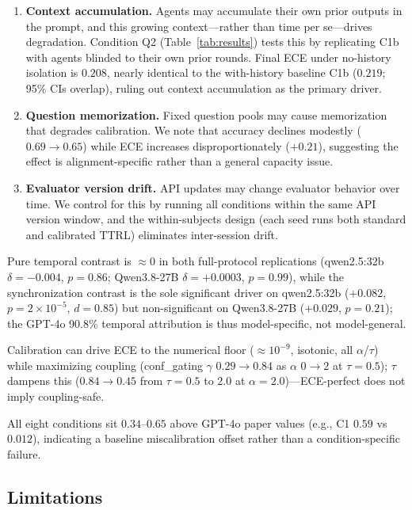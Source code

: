 \documentclass[11pt]{article}
\theoremstyle{definition}
\theoremstyle{remark}
\begin{document}
\begin{enumerate}[leftmargin=*,nosep]
    \item \textbf{Context accumulation.} Agents may accumulate their own prior outputs in the prompt, and this growing context---rather than time per se---drives degradation. Condition Q2 (Table~\ref{tab:results}) tests this by replicating C1b with agents blinded to their own prior rounds. Final ECE under no-history isolation is $0.208$, nearly identical to the with-history baseline C1b ($0.219$; 95\% CIs overlap), ruling out context accumulation as the primary driver.
    \item \textbf{Question memorization.} Fixed question pools may cause memorization that degrades calibration. We note that accuracy declines modestly ($0.69 \to 0.65$) while ECE increases disproportionately ($+0.21$), suggesting the effect is alignment-specific rather than a general capacity issue.
    \item \textbf{Evaluator version drift.} API updates may change evaluator behavior over time. We control for this by running all conditions within the same API version window, and the within-subjects design (each seed runs both standard and calibrated TTRL) eliminates inter-session drift.
\end{enumerate}

Pure temporal contrast is $\approx 0$ in both full-protocol replications (qwen2.5:32b $\delta=-0.004$, $p=0.86$; Qwen3.8-27B $\delta=+0.0003$, $p=0.99$), while the synchronization contrast is the sole significant driver on qwen2.5:32b ($+0.082$, $p=2\times10^{-5}$, $d=0.85$) but non-significant on Qwen3.8-27B ($+0.029$, $p=0.21$); the GPT-4o 90.8\% temporal attribution is thus model-specific, not model-general.

Calibration can drive ECE to the numerical floor ($\approx 10^{-9}$, isotonic, all $\alpha$/$\tau$) while maximizing coupling (conf\_gating $\gamma$ $0.29\to0.84$ as $\alpha$ $0\to2$ at $\tau=0.5$); $\tau$ dampens this ($0.84\to0.45$ from $\tau=0.5$ to $2.0$ at $\alpha=2.0$)---ECE-perfect does not imply coupling-safe.

All eight conditions sit $0.34$--$0.65$ above GPT-4o paper values (e.g., C1 $0.59$ vs $0.012$), indicating a baseline miscalibration offset rather than a condition-specific failure.

\subsection{Limitations}
\end{document}
